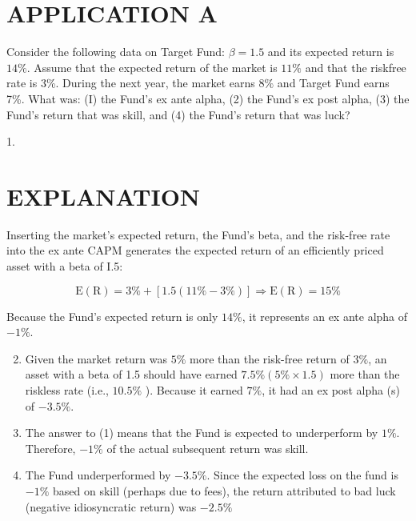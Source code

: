 \documentclass[11pt]{article}
\begin{document}
\section*{APPLICATION A}
Consider the following data on Target Fund: $\beta=1.5$ and its expected return is $14 \%$. Assume that the expected return of the market is $11 \%$ and that the riskfree rate is 3\%. During the next year, the market earns $8 \%$ and Target Fund earns 7\%. What was: (I) the Fund's ex ante alpha, (2) the Fund's ex post alpha, (3) the Fund's return that was skill, and (4) the Fund's return that was luck?

1.

\section*{EXPLANATION}
Inserting the market's expected return, the Fund's beta, and the risk-free rate into the ex ante CAPM generates the expected return of an efficiently priced asset with a beta of I.5:

$$
\mathrm{E}(\mathrm{R})=3 \%+[1.5(11 \%-3 \%)] \Rightarrow \mathrm{E}(\mathrm{R})=15 \%
$$

Because the Fund's expected return is only $14 \%$, it represents an ex ante alpha of $-1 \%$.

\begin{enumerate}
  \setcounter{enumi}{1}
  \item Given the market return was $5 \%$ more than the risk-free return of $3 \%$, an asset with a beta of 1.5 should have earned $7.5 \%(5 \% \times 1.5)$ more than the riskless rate (i.e., $10.5 \%$ ). Because it earned $7 \%$, it had an ex post alpha (s) of $-3.5 \%$.

  \item The answer to (1) means that the Fund is expected to underperform by $1 \%$. Therefore, $-1 \%$ of the actual subsequent return was skill.

  \item The Fund underperformed by $-3.5 \%$. Since the expected loss on the fund is $-1 \%$ based on skill (perhaps due to fees), the return attributed to bad luck (negative idiosyncratic return) was $-2.5 \%$

\end{enumerate}
\end{document}

